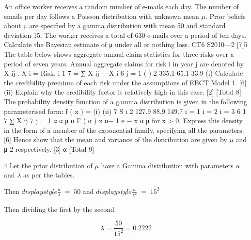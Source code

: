 \documentclass[a4paper,12pt]{article}
\begin{document}
 

An office worker receives a random number of e-mails each day. The number of emails per day follows a Poisson distribution with unknown mean $\mu$. Prior beliefs about μ are specified by a gamma distribution with mean 50 and standard deviation
15. The worker receives a total of 630 e-mails over a period of ten days.
Calculate the Bayesian estimate of μ under all or nothing loss.
CT6 S2010—2
[7]5
The table below shows aggregate annual claim statistics for three risks over a period
of seven years. Annual aggregate claims for risk i in year j are denoted by X ij .
X i =
Risk, i
1 7
= ∑ X ij − X i
6 j = 1
(
)
2
335.1
65.1
33.9
(i) Calculate the credibility premium of each risk under the assumptions of EBCT
Model 1.
[6]
(ii) Explain why the credibility factor is relatively high in this case.
[2]
[Total 8]
The probability density function of a gamma distribution is given in the following
parameterised form:
f ( x ) =
(i)
(ii)
7
S i 2
127.9
88.9
149.7
i = 1
i = 2
i = 3
6
1 7
∑ X ij
7 j = 1
α α
μ α Γ ( α )
x
α− 1
e
−
x α
μ
for x > 0.
Express this density in the form of a member of the exponential family,
specifying all the parameters.
[6]
Hence show that the mean and variance of the distribution are given by $\mu$ and
μ 2
respectively.
[3]
α
[Total 9]

\newpage

4
Let the prior distribution of $\mu$  have a Gamma distribution with parameters $\alpha$ and $\lambda$ 
as per the tables.

Then
${ displaystyle \frac{a}{\lambda} \;=\; 50 }$ and ${ displaystyle \frac{a}{\lambda^2} \;=\; 15^2 }$

Then dividing the first by the second 

\[ \lambda  = \frac{50}{15^2} = 0.2222\]
\end{document}
